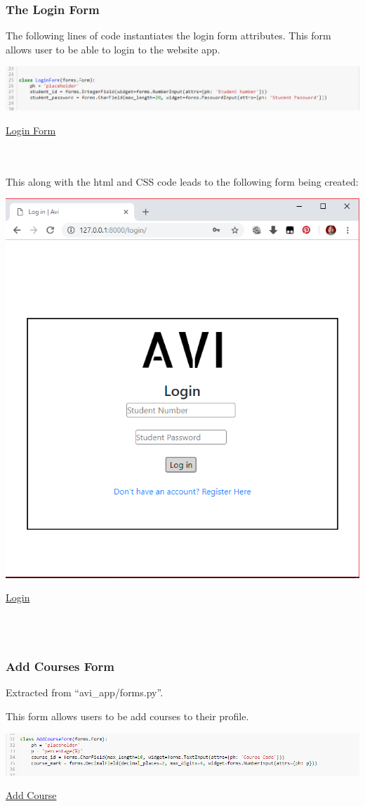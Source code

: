\documentclass[10pt]{article}
\begin{document}
\subsubsection{The Login Form}

The following lines of code instantiates the login form attributes. This form allows user to be able to login to the website app.

\begin{center}
\includegraphics[width=.9\textwidth]{login_form.png}
\end{center}
\caption{\underline{Login Form}} \\ \\

This along with the html and CSS code leads to the following form being created:

\begin{center}
\includegraphics[width=.4\textwidth]{login_page.png}
\end{center}
\caption{\underline{Login}} \\ \\

\subsubsection{Add Courses Form}
Extracted from “avi\_app/forms.py”.

This form allows users to be add courses to their profile.

\begin{center}
\includegraphics[width=.9\textwidth]{add_course.png}
\end{center}
\caption{\underline{Add Course}} \\ \\
\end{document}
